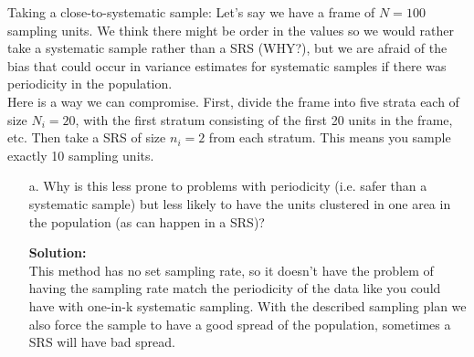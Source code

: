 \documentclass[12pt]{article}
\makeatletter
\theoremstyle{homework}
\newenvironment{exercise}[1]
{\def\@currentlabel{#1}\exercisecore}
{\endexercisecore}
\newcommand{\localhead}[1]{\par\smallskip\noindent\textbf{#1}\nobreak\\}%
\newcommand\solution{\localhead{Solution:}}
\makeatother
\begin{document}
\begin{exercise}{2}
\begin{enumerate}
    \end{enumerate}
\end{exercise}
\vspace{1in}






\begin{exercise}{3} Taking a close-to-systematic sample: Let’s say we have a frame 
    of $N = 100$ sampling units. We think there might be order in the values so we 
    would rather take a systematic sample rather than a SRS (WHY?), but we are afraid 
    of the bias that could occur in variance estimates for systematic samples if 
    there was periodicity in the population. \\

    Here is a way we can compromise. First, divide the frame into five strata each of
     size $N_i = 20$, with the first stratum consisting of the first 20 units in the
      frame, etc. Then take a SRS of size $n_i = 2$ from each stratum. This means
       you sample exactly 10 sampling units.\\
    \begin{enumerate}
        \item[a.]  Why is this less prone to problems with periodicity 
        (i.e. safer than a systematic sample) but less likely to have the 
        units clustered in one area in the population (as can happen in a SRS)?\\
        \solution This method has no set sampling rate, so it doesn't have the problem 
        of having the sampling rate match the periodicity of the data like you could have with one-in-k systematic 
        sampling. With the described sampling plan we also force the sample to have a good spread of the 
        population, sometimes a SRS will have bad spread. 
        \vspace{.15in}


\end{enumerate}
\end{exercise}
\end{document}
